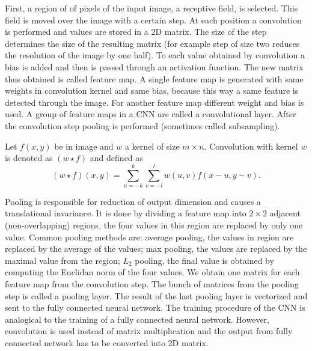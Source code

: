 First, a region of of pixels of the input image, a receptive field,  is selected. This field is moved over the image with a certain step. At each position a convolution is performed and values are stored in a 2D matrix. The size of the step determines the size of the resulting matrix (for example step of size two reduces the resolution of the image by one half). To each value obtained by convolution a bias is added and then is passed through an activation function. The new matrix thus obtained is called feature map. A single feature map is generated with same weights in convolution kernel and same bias, because this way a same feature is detected through the image. For another feature map different weight and bias is used. A group of feature maps in a CNN are called a convolutional layer. After the convolution step pooling is performed (sometimes called subsampling).\cite{DIP}

\begin{definition}
    Let $f(x,y)$ be in image and $w$ a kernel of size $m \times n$. Convolution with kernel $w$ is denoted as 
    $(w\star f)$     and defined as
    \begin{equation}
        (w\star f)(x,y) = \sum_{u=-k} ^{k} \sum_{v=-l} ^{l} w(u,v) f(x-u, y-v).
    \end{equation}
\end{definition}

Pooling is responsible for reduction of output dimension and causes a translational invariance. It is done by dividing a feature map into $2 \times 2 $ adjacent (non-overlapping) regions, the four values in this region are replaced by only one value. Common pooling methods are: average pooling, the values in region are replaced by the average of the values; max pooling, the values are replaced by the maximal value from the region; $L_2$ pooling, the final value is obtained by computing the Euclidan norm of the four values. We obtain one matrix for each feature map from the convolution step. The bunch of matrices from the pooling step is called a pooling layer. The result of the last pooling layer is vectorized and sent to the fully connected neural network. The training procedure of the CNN is analogical to the training of a fully connected neural network. However, convolution is used instead of matrix multiplication and the output from fully connected network has to be converted into 2D matrix.\cite{DIP}












